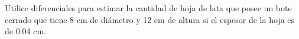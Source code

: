 \item Utilice diferenciales para estimar la cantidad de hoja de lata que posee un bote cerrado que tiene 8 cm de diámetro y 12 cm de altura si el espesor de la hoja es de 0.04 cm.
